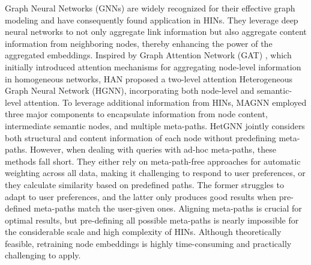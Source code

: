Graph Neural Networks (GNNs) are widely recognized for their effective graph modeling and have consequently found application in HINs. They leverage deep neural networks to not only aggregate link information but also aggregate content information from neighboring nodes, thereby enhancing the power of the aggregated embeddings. Inspired by Graph Attention Network (GAT) \cite{velivckovic2017graph}, which initially introduced attention mechanisms for aggregating node-level information in homogeneous networks, HAN \cite{wang2019heterogeneous} proposed a two-level attention Heterogeneous Graph Neural Network (HGNN), incorporating both node-level and semantic-level attention. To leverage additional information from HINs, MAGNN \cite{fu2020magnn} employed three major components to encapsulate information from node content, intermediate semantic nodes, and multiple meta-paths. HetGNN \cite{zhang2019heterogeneous} jointly considers both structural and content information of each node without predefining meta-paths. However, when dealing with queries with ad-hoc meta-paths, these methods fall short. They either rely on meta-path-free approaches for automatic weighting across all data, making it challenging to respond to user preferences, or they calculate similarity based on predefined paths. The former struggles to adapt to user preferences, and the latter only produces good results when pre-defined meta-paths match the user-given ones. Aligning meta-paths is crucial for optimal results, but pre-defining all possible meta-paths is nearly impossible for the considerable scale and high complexity of HINs. Although theoretically feasible, retraining node embeddings is highly time-consuming and practically challenging to apply.



